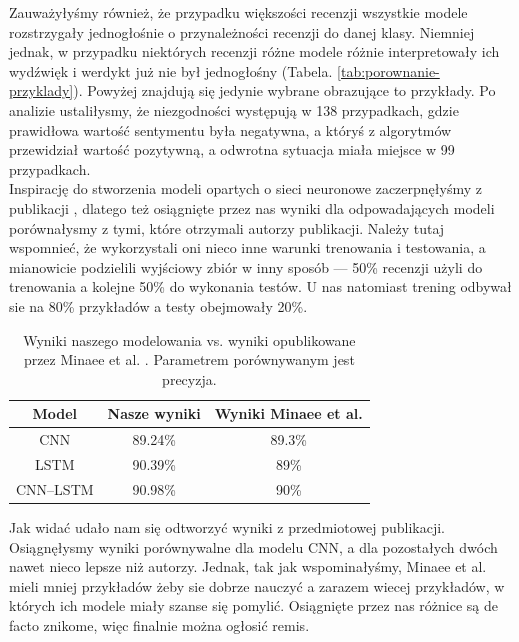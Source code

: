 \noindent Zauważyłyśmy również, że przypadku większości recenzji wszystkie modele rozstrzygały jednogłośnie o przynależności recenzji do danej klasy. Niemniej jednak, w przypadku niektórych recenzji różne modele różnie interpretowały ich wydźwięk i werdykt już nie był jednogłośny (Tabela. \ref{tab:porownanie-przyklady}). Powyżej znajdują się jedynie wybrane obrazujące to przykłady. Po analizie ustaliłysmy, że niezgodności występują w 138 przypadkach, gdzie prawidłowa wartość sentymentu była negatywna, a któryś z algorytmów przewidział wartość pozytywną, a odwrotna sytuacja miała miejsce w 99 przypadkach. \\

\bigskip
\noindent Inspirację do stworzenia modeli opartych o sieci neuronowe zaczerpnęłyśmy z publikacji \cite{minaee2019deep}, dlatego też osiągnięte przez nas wyniki dla odpowadających modeli porównałysmy z tymi, które otrzymali autorzy publikacji. Należy tutaj wspomnieć, że wykorzystali oni nieco inne warunki trenowania i testowania, a mianowicie podzielili wyjściowy zbiór w inny sposób --- 50\% recenzji użyli do trenowania a kolejne 50\% do wykonania testów. U nas natomiast trening odbywał sie na 80\% przykładów a testy obejmowały 20\%.

\begin{table} [H]
	\caption{Wyniki naszego modelowania vs. wyniki opublikowane przez Minaee et al. \cite{minaee2019deep}.  Parametrem porównywanym jest precyzja.}
	\begin{center}
		\begin{tabular}{c |c|c }
			\hline
			Model &  Nasze wyniki   &  Wyniki Minaee et al. \\
			\hline
			CNN & 89.24\% & 89.3\% \\ 
			LSTM & 90.39\% & 89\% \\ 
			CNN--LSTM &90.98\% & 90\%\\ 
			\hline
		\end{tabular}
	\end{center}
\end{table}

\noindent Jak widać udało nam się odtworzyć wyniki z przedmiotowej publikacji. Osiągnęłysmy wyniki porównywalne dla modelu CNN, a dla pozostałych dwóch nawet nieco lepsze niż autorzy. Jednak, tak jak wspominałyśmy, Minaee et al. mieli mniej przykładów żeby sie dobrze nauczyć a zarazem wiecej przykładów, w których ich modele miały szanse się pomylić. Osiągnięte przez nas różnice są de facto znikome, więc finalnie można ogłosić remis.